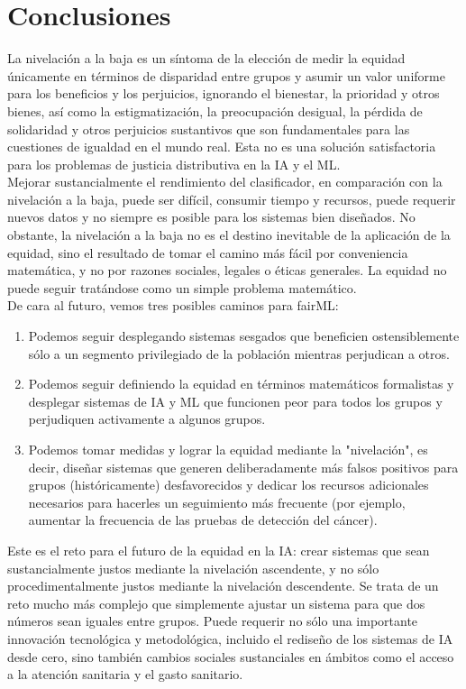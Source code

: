 \section{Conclusiones}
La nivelación a la baja es un síntoma de la elección de medir la equidad únicamente en términos de disparidad entre grupos y asumir un valor uniforme para los beneficios y los perjuicios, ignorando el bienestar, la prioridad y otros bienes, así como la estigmatización, la preocupación desigual, la pérdida de solidaridad y otros perjuicios sustantivos que son fundamentales para las cuestiones de igualdad en el mundo real. Esta no es una solución satisfactoria para los problemas de justicia distributiva en la IA y el ML.\\

Mejorar sustancialmente el rendimiento del clasificador, en comparación con la nivelación a la baja, puede ser difícil, consumir tiempo y recursos, puede requerir nuevos datos y no siempre es posible para los sistemas bien diseñados. No obstante, la nivelación a la baja no es el destino inevitable de la aplicación de la equidad, sino el resultado de tomar el camino más fácil por conveniencia matemática, y no por razones sociales, legales o éticas generales. La equidad no puede seguir tratándose como un simple problema matemático.\\

De cara al futuro, vemos tres posibles caminos para fairML: 

\begin{enumerate}[1.]
    \item Podemos seguir desplegando sistemas sesgados que beneficien ostensiblemente sólo a un segmento privilegiado de la población mientras perjudican a otros.
    \item Podemos seguir definiendo la equidad en términos matemáticos formalistas y desplegar sistemas de IA y ML que funcionen peor para todos los grupos y perjudiquen activamente a algunos grupos. 
    \item Podemos tomar medidas y lograr la equidad mediante la "nivelación", es decir, diseñar sistemas que generen deliberadamente más falsos positivos para grupos (históricamente) desfavorecidos y dedicar los recursos adicionales necesarios para hacerles un seguimiento más frecuente (por ejemplo, aumentar la frecuencia de las pruebas de detección del cáncer).
\end{enumerate}

Este es el reto para el futuro de la equidad en la IA: crear sistemas que sean sustancialmente justos mediante la nivelación ascendente, y no sólo procedimentalmente justos mediante la nivelación descendente. Se trata de un reto mucho más complejo que simplemente ajustar un sistema para que dos números sean iguales entre grupos. Puede requerir no sólo una importante innovación tecnológica y metodológica, incluido el rediseño de los sistemas de IA desde cero, sino también cambios sociales sustanciales en ámbitos como el acceso a la atención sanitaria y el gasto sanitario.\\


